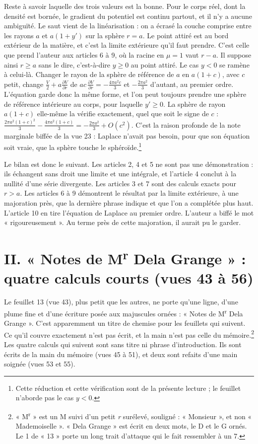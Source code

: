 \documentclass[11pt,a4paper]{article}
\begin{document}
Reste à savoir laquelle des trois valeurs est la bonne. Pour le corps réel,
dont la densité est bornée, le gradient du potentiel est continu partout, et
il n'y a aucune ambiguïté. Le saut vient de la linéarisation : on a écrasé
la couche comprise entre les rayons \(a\) et \(a(1+y')\) sur la sphère
\(r=a\). Le point attiré est au bord extérieur de la matière, et c'est la
limite extérieure qu'il faut prendre. C'est celle que prend l'auteur aux
articles 6 à 9, où la racine en \(\mu=1\) vaut \(r-a\). Il suppose ainsi
\(r\ge a\) sans le dire, c'est-à-dire \(y\ge0\) au point attiré. Le cas
\(y<0\) se ramène à celui-là. Changer le rayon de la sphère de référence de
\(a\) en \(a(1+c)\), avec \(c\) petit, change \(\frac V2+a\frac{\partial
V}{\partial r}\) de \(ac\,\frac{\partial V}{\partial r}=-\frac{4\pi a^2c}{3}\)
et \(-\frac{2\pi a^2}{3}\) d'autant, au premier ordre. L'équation garde donc
la même forme, et l'on peut toujours prendre une sphère de référence
intérieure au corps, pour laquelle \(y'\ge0\). La sphère de rayon \(a(1+c)\)
elle-même la vérifie exactement, quel que soit le signe de \(c\) :
\(\frac{2\pi a^2(1+c)^2}{3}-\frac{4\pi a^2(1+c)}{3}=-\frac{2\pi a^2}{3}+O(c^2)\).
C'est la raison profonde de la note marginale biffée de la vue 23 : Laplace
n'avait pas besoin, pour que son équation soit vraie, que la sphère touche le
sphéroïde.\footnote{Cette réduction et cette vérification sont de la présente
lecture ; le feuillet n'aborde pas le cas \(y<0\).}

Le bilan est donc le suivant. Les articles 2, 4 et 5 ne sont pas une
démonstration : ils échangent sans droit une limite et une intégrale, et
l'article 4 conclut à la nullité d'une série divergente. Les articles 3 et 7
sont des calculs exacts pour \(r>a\). Les articles 6 à 9 démontrent le
résultat par la limite extérieure, à une majoration près, que la dernière
phrase indique et que l'on a complétée plus haut. L'article 10 en tire
l'équation de Laplace au premier ordre. L'auteur a biffé le mot
« rigoureusement ». Au terme près de cette majoration, il aurait pu le
garder.

\section*{II. « Notes de M\textsuperscript{r} Dela Grange » : quatre calculs courts (vues 43 à 56)}

Le feuillet 13 (vue 43), plus petit que les autres, ne porte qu'une ligne, d'une
plume fine et d'une écriture posée aux majuscules ornées : « Notes de
M\textsuperscript{r} Dela Grange ». C'est apparemment un titre de chemise pour
les feuillets qui suivent. Ce qu'il couvre exactement n'est pas écrit, et la
main n'est pas celle du mémoire.\footnote{« M\textsuperscript{r} » est un M
suivi d'un petit \emph{r} surélevé, souligné : « Monsieur », et non
« Mademoiselle ». « Dela Grange » est écrit en deux mots, le D et le G ornés.
Le 1 de « 13 » porte un long trait d'attaque qui le fait ressembler à un 7.}
Les quatre calculs qui suivent sont sans titre ni phrase d'introduction. Ils
sont écrits de la main du mémoire (vues 45 à 51), et deux sont refaits d'une
main soignée (vues 53 et 55).
\end{document}
